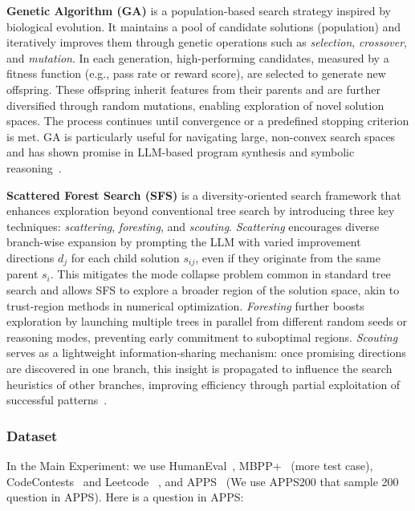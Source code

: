 \documentclass[11pt]{article}
\theoremstyle{definition}
\theoremstyle{remark}
\begin{document}
\textbf{Genetic Algorithm (GA)} is a population-based search strategy inspired by biological evolution. It maintains a pool of candidate solutions (population) and iteratively improves them through genetic operations such as \emph{selection}, \emph{crossover}, and \emph{mutation}. In each generation, high-performing candidates, measured by a fitness function (e.g., pass rate or reward score), are selected to generate new offspring. These offspring inherit features from their parents and are further diversified through random mutations, enabling exploration of novel solution spaces. The process continues until convergence or a predefined stopping criterion is met. GA is particularly useful for navigating large, non-convex search spaces and has shown promise in LLM-based program synthesis and symbolic reasoning~\citep{FunSearch2023}.



\textbf{Scattered Forest Search (SFS)} is a diversity-oriented search framework that enhances exploration beyond conventional tree search by introducing three key techniques: \emph{scattering}, \emph{foresting}, and \emph{scouting}. \emph{Scattering} encourages diverse branch-wise expansion by prompting the LLM with varied improvement directions $d_j$ for each child solution $s_{ij}$, even if they originate from the same parent $s_i$. This mitigates the mode collapse problem common in standard tree search and allows SFS to explore a broader region of the solution space, akin to trust-region methods in numerical optimization. \emph{Foresting} further boosts exploration by launching multiple trees in parallel from different random seeds or reasoning modes, preventing early commitment to suboptimal regions. \emph{Scouting} serves as a lightweight information-sharing mechanism: once promising directions are discovered in one branch, this insight is propagated to influence the search heuristics of other branches, improving efficiency through partial exploitation of successful patterns~\citep{light2025sfs}.


\subsubsection{Dataset}
In the Main Experiment: we use HumanEval~\citep{chen2021evaluating}, MBPP+~\citep{austin2021program} (more test case), CodeContests~\citep{doi:10.1126/science.abq1158} and Leetcode~\citep{guo2024deepseek} , and APPS~\citep{hendrycks2021measuring} (We use APPS200 that sample 200 question in APPS). Here is a question in APPS:
\end{document}
